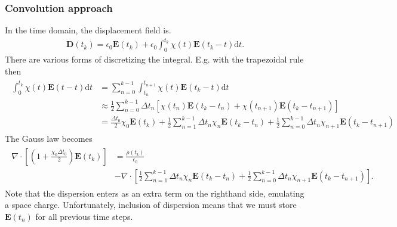 \documentclass[letterpaper,10pt,english]{sphinxmanual}
\begin{document}
\subsubsection{Convolution approach}
\label{\detokenize{Solvers/Electrostatics:convolution-approach}}
In the time domain, the displacement field is.
\begin{equation*}
\begin{split}\mathbf{D}(t_k) = \epsilon_0\mathbf{E}(t_k) + \epsilon_0\int_0^{t_k} \chi(t)\mathbf{E}(t_k-t)\text{d}t.\end{split}
\end{equation*}
There are various forms of discretizing the integral.
E.g. with the trapezoidal rule then
\begin{equation*}
\begin{split}\begin{split}
\int_0^{t_k}\chi(t)\mathbf{E}(t-t)\text{d}t &= \sum_{n=0}^{k-1} \int_{t_n}^{t_{n+1}}\chi(t)\mathbf{E}(t_k-t)\text{d}t \\
&\approx \frac{1}{2}\sum_{n=0}^{k-1}\Delta t_n\left[\chi(t_n)\mathbf{E}(t_k-t_n) + \chi(t_{n+1})\mathbf{E}(t_k-t_{n+1})\right] \\
&= \frac{\Delta t_0}{2}\chi_0\mathbf{E}(t_k) + \frac{1}{2}\sum_{n=1}^{k-1}\Delta t_n\chi_n\mathbf{E}(t_k-t_n) + \frac{1}{2}\sum_{n=0}^{k-1}\Delta t_n\chi_{n+1}\mathbf{E}(t_k-t_{n+1})
\end{split}\end{split}
\end{equation*}
The Gauss law becomes
\begin{equation*}
\begin{split}\begin{split}
\nabla\cdot\left[\left(1+\frac{\chi_0\Delta t_0}{2}\right)\mathbf{E}(t_k)\right] &= \frac{\rho(t_k)}{\epsilon_0}\\
&- \nabla\cdot\left[\frac{1}{2}\sum_{n=1}^{k-1}\Delta t_n\chi_n\mathbf{E}(t_k-t_n) + \frac{1}{2}\sum_{n=0}^{k-1}\Delta t_n\chi_{n+1}\mathbf{E}(t_k-t_{n+1})\right].
\end{split}\end{split}
\end{equation*}
Note that the dispersion enters as an extra term on the right\sphinxhyphen{}hand side, emulating a space charge.
Unfortunately, inclusion of dispersion means that we must store \(\mathbf{E}(t_n)\) for all previous time steps.
\end{document}
